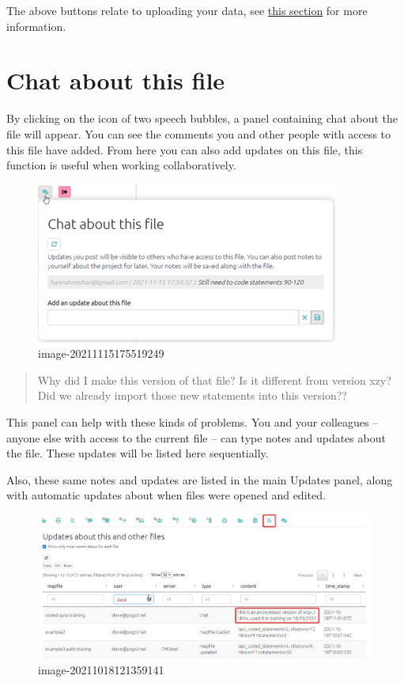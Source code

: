 \documentclass[
]{book}
\begin{document}
The above buttons relate to uploading your data, see \protect\hyperlink{ximport}{this section} for more information.

\hypertarget{chat-about-this-file}{%
\section{Chat about this file}\label{chat-about-this-file}}

By clicking on the icon of two speech bubbles, a panel containing chat about the file will appear. You can see the comments you and other people with access to this file have added. From here you can also add updates on this file, this function is useful when working collaboratively.

\begin{figure}
\centering
\includegraphics{_assets/image-20211115175519249.png}
\caption{image-20211115175519249}
\end{figure}

\begin{quote}
Why did I make this version of that file? Is it different from version xzy? Did we already import those new statements into this version??
\end{quote}

This panel can help with these kinds of problems. You and your colleagues -- anyone else with access to the current file -- can type notes and updates about the file. These updates will be listed here sequentially.

Also, these same notes and updates are listed in the main Updates panel, along with automatic updates about when files were opened and edited.

\begin{figure}
\centering
\includegraphics{_assets/image-20211018121359141.png}
\caption{image-20211018121359141}
\end{figure}
\end{document}
